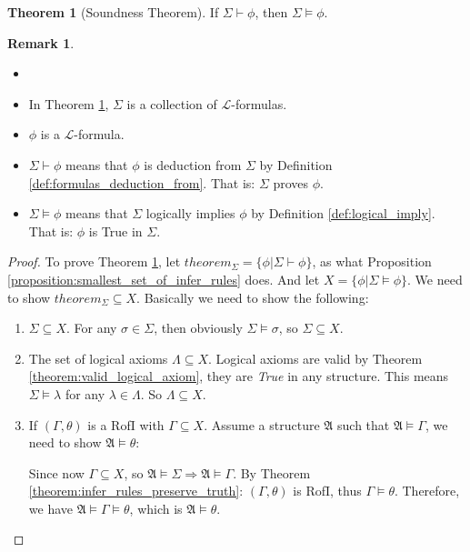 \documentclass[11pt,letterpaper]{book}
\theoremstyle{definition}
\newtheorem{theorem}{Theorem}[section]
\newtheorem{remark}{Remark}[section]
\begin{document}
\begin{theorem}[Soundness Theorem]\label{theorem:soundness}
If $\Sigma \vdash \phi $, then $\Sigma \models \phi$.
\end{theorem}

\begin{remark}
\begin{itemize}
\item[]
\item{In Theorem \ref{theorem:soundness}, $\Sigma$ is a collection of
$\mathcal{L}$-formulas.}
\item{$\phi$ is a $\mathcal{L}$-formula.}
\item{$\Sigma \vdash \phi $ means that $\phi$ is deduction from $\Sigma$
by Definition \ref{def:formulas_deduction_from}. That is: $\Sigma$
proves $\phi$. }
\item{$\Sigma \models \phi$ means that $\Sigma$ logically implies $\phi$
by Definition \ref{def:logical_imply}. That is: $\phi$ is True in $\Sigma$.}

\end{itemize}
\end{remark}

\begin{proof}

To prove Theorem \ref{theorem:soundness}, let $theorem_{\Sigma} = \{
\phi | \Sigma \vdash \phi \}$, as what Proposition
\ref{proposition:smallest_set_of_infer_rules} does. And let $X = \{ \phi
| \Sigma \models \phi \}$. We need to show $theorem_{\Sigma} \subseteq
X$. Basically we need to show the following:
\begin{enumerate}
\item{$\Sigma \subseteq X$. For any $\sigma \in \Sigma$, then obviously
$\Sigma \models \sigma$, so $\Sigma \subseteq X$.}
\item{The set of logical axioms $\Lambda \subseteq X$. Logical axioms
are valid by Theorem \ref{theorem:valid_logical_axiom}, they are
\emph{True} in any structure. This means $\Sigma
\models \lambda$ for any $\lambda \in \Lambda$. So $\Lambda \subseteq X$.}
\item{If $(\Gamma , \theta)$ is a RofI with $\Gamma \subseteq X$. Assume 
a structure $\mathfrak{A}$ such that $\mathfrak{A} \models \Gamma$, we 
need to show $\mathfrak{A}
\models \theta$:

Since now $\Gamma \subseteq X$, so $\mathfrak{A} \models \Sigma
\Rightarrow \mathfrak{A} \models \Gamma $. By Theorem
\ref{theorem:infer_rules_preserve_truth}: $(\Gamma, \theta)$ is RofI,
thus $\Gamma \models \theta$. Therefore, we have
$\mathfrak{A} \models \Gamma \models \theta$, which is $\mathfrak{A} 
\models \theta$.}
\end{enumerate}


\end{proof}
\end{document}
